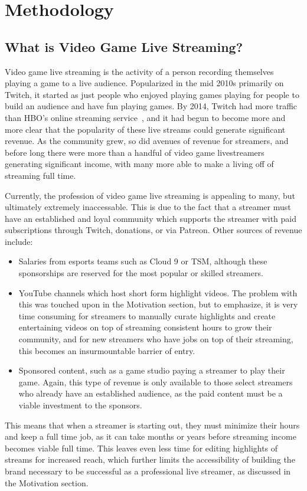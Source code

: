\documentclass[12pt]{article}
\begin{document}
\section{Methodology}
\subsection{What is Video Game Live Streaming?}
Video game live streaming is the activity of a person recording themselves playing a game to a live audience. Popularized in the mid 2010s primarily on Twitch, it started
as just people who enjoyed playing games playing for people to build an audience and have fun playing games. By 2014, Twitch had more traffic than HBO's online streaming 
service~\cite{graziano_2014}, and it had begun to become more and more clear that the popularity of these live streams could generate significant revenue. As the community grew,
so did avenues of revenue for streamers, and before long there were more than a handful of video game livestreamers generating significant income, with many more able to make a 
living off of streaming full time.



Currently, the profession of video game live streaming is appealing to many, but ultimately extremely inaccessable. This is due to the fact that a streamer must have an 
established and loyal community which supports the streamer with paid subscriptions through Twitch, donations, or via Patreon. Other sources of revenue include:
\begin{itemize}
    \item Salaries from esports teams such as Cloud 9 or TSM, although these sponsorships are reserved for the most popular or skilled streamers. 
    \item YouTube channels which host short form highlight videos. The problem with this was touched upon in the Motivation section, but to emphasize, 
    it is very time consuming for streamers to manually curate highlights and create entertaining videos on top of streaming consistent hours to grow their 
    community, and for new streamers who have jobs on top of their streaming, this becomes an insurmountable barrier of entry.
    \item Sponsored content, such as a game studio paying a streamer to play their game. Again, this type of revenue is only available to those select streamers
    who already have an established audience, as the paid content must be a viable investment to the sponsors.
\end{itemize}
This means that when a streamer is starting out, they must minimize their hours and keep a full time job, as it can take months or years before streaming 
income becomes viable full time. This leaves even less time for editing highlights of streams for increased reach, which further limits the accessibility
of building the brand necessary to be successful as a professional live streamer,  as discussed in the Motivation section.
\end{document}
